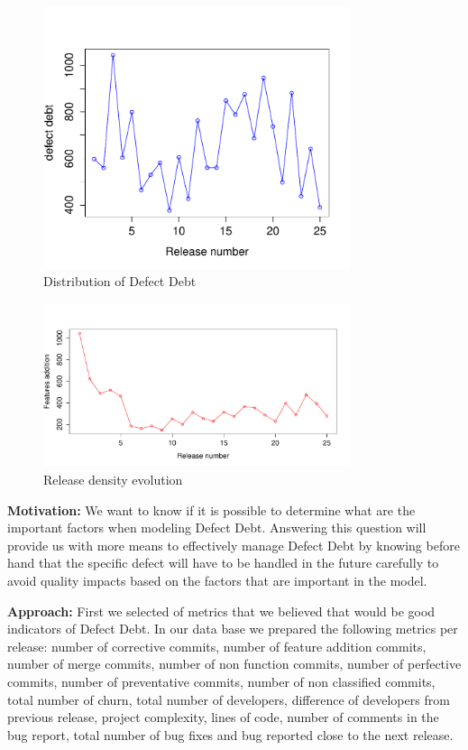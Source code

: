 
\begin{figure}[thb!]
	\caption{Distribution of Defect Debt}
	\label{fig:technical_debt}
	\includegraphics[width=90mm,scale=0.5]{figures/technical_debt}
\end{figure}

\begin{figure}[thb!]
    \caption{Release density evolution}
    \label{fig:feature_addition_releases}
    \includegraphics[width=90mm,scale=0.5]{figures/feature_addition_releases}
\end{figure}

\vspace{3mm}
\noindent\rqiii
\vspace{3mm}

\noindent\textbf{Motivation:} We want to know if it is possible to determine what are the important factors when modeling Defect Debt. Answering this question will provide us with more means to effectively manage Defect Debt by knowing before hand that the specific defect will have to be handled in the future carefully to avoid quality impacts based on the factors that are important in the model. 

\vspace{1mm}
\noindent\textbf{Approach:} First we selected  of metrics that we believed that would be good indicators of Defect Debt. In our data base we prepared the following metrics per release: number of corrective commits, number of feature addition commits, number of merge commits, number of non function commits, number of perfective commits, number of preventative commits, number of non classified commits, total number of churn, total number of developers, difference of developers from previous release, project complexity, lines of code, number of comments in the bug report, total number of bug fixes and bug reported close to the next release.

